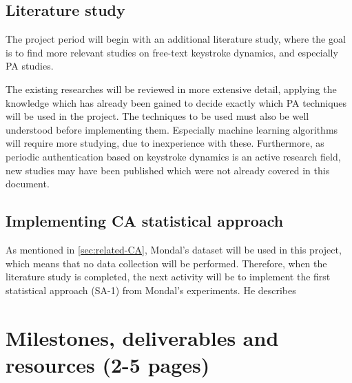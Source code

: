 \documentclass[informationsecurity]{gucmasterproject}
\begin{document}
\section{Literature study}
The project period will begin with an additional literature study, where the goal is to find more relevant studies on free-text keystroke dynamics, and especially PA studies.



The existing researches will be reviewed in more extensive detail, applying the knowledge which has already been gained to decide exactly which PA techniques will be used in the project.
The techniques to be used must also be well understood before implementing them.
Especially machine learning algorithms will require more studying, due to inexperience with these.
Furthermore, as periodic authentication based on keystroke dynamics is an active research field, new studies may have been published which were not already covered in this document.


\section{Implementing CA statistical approach}

As mentioned in \cref{sec:related-CA}, Mondal's \cite{mondal} dataset will be used in this project, which means that no data collection will be performed.
Therefore, when the literature study is completed, the next activity will be to implement the first statistical approach (SA-1) from Mondal's experiments.
He describes 




\chapter{Milestones, deliverables and resources (2-5 pages)}
\end{document}
